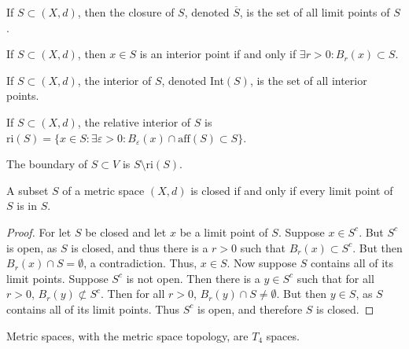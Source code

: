 \documentclass[crop=false,class=book,oneside]{standalone}
\begin{document}
            \begin{definition}
            If $S\subset (X,d)$, then the closure of $S$, denoted $\overline{S}$, is the set of all limit points of $S$.
            \end{definition}
            \begin{definition}
            If $S\subset (X,d)$, then $x\in S$ is an interior point if and only if $\exists r>0:B_{r}(x)\subset S$.
            \end{definition}
            \begin{definition}
            If $S\subset (X,d)$, the interior of $S$, denoted Int$(S)$, is the set of all interior points.
            \end{definition}
            \begin{definition}
            If $S\subset (X,d)$, the relative interior of $S$ is $\textrm{ri}(S)= \{x\in S:\exists \varepsilon>0:B_{\varepsilon}(x)\cap \textrm{aff}(S)\subset S\}$.
            \end{definition}
            \begin{definition}
            The boundary of $S\subset V$ is $S\setminus \textrm{ri}(S)$.
            \end{definition}
            \begin{theorem}
            A subset $S$ of a metric space $(X,d)$ is closed if and only if every limit point of $S$ is in $S$.
            \end{theorem}
            \begin{proof}
            For let $S$ be closed and let $x$ be a limit point of $S$. Suppose $x\in S^c$. But $S^c$ is open, as $S$ is closed, and thus there is a $r>0$ such that $B_{r}(x)\subset S^c$. But then $B_{r}(x)\cap S = \emptyset$, a contradiction. Thus, $x\in S$. Now suppose $S$ contains all of its limit points. Suppose $S^c$ is not open. Then there is a $y\in S^c$ such that for all $r>0$, $B_{r}(y)\not \subset S^c$. Then for all $r>0$, $B_{r}(y)\cap S \ne \emptyset$. But then $y\in S$, as $S$ contains all of its limit points. Thus $S^c$ is open, and therefore $S$ is closed.
            \end{proof}
            \begin{theorem}
            Metric spaces, with the metric space topology, are $T_4$ spaces.
            \end{theorem}
\end{document}
